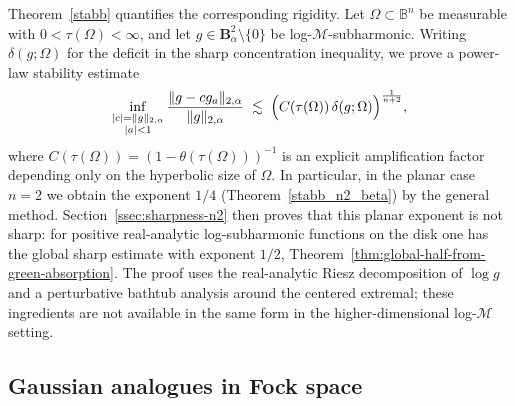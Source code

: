 \documentclass[a4paper,10pt]{amsart}
\begin{document}
Theorem~\ref{stabb} quantifies the corresponding rigidity.
Let $\Omega\subset\mathbb B^n$ be measurable with $0<\tau(\Omega)<\infty$, and let
$g\in \mathbf B_\alpha^2\setminus\{0\}$ be log-$\mathcal M$-subharmonic.
Writing $\delta(g;\Omega)$ for the deficit in the sharp concentration inequality, we prove a
power-law stability estimate
\[
\inf_{\substack{|c|=\|g\|_{2,\alpha}\\ |a|<1}}
\frac{\|g-cg_a\|_{2,\alpha}}{\|g\|_{2,\alpha}}
\;\lesssim\;
\Bigl(C(\tau(\Omega))\,\delta(g;\Omega)\Bigr)^{\frac{1}{n+2}},
\]
where $C(\tau(\Omega))=(1-\theta(\tau(\Omega)))^{-1}$ is an explicit amplification factor depending
only on the hyperbolic size of $\Omega$. In particular, in the planar case $n=2$ we obtain the
exponent $1/4$ (Theorem~\ref{stabb_n2_beta}) by the general method.
Section~\ref{ssec:sharpness-n2} then proves that this planar exponent is not
sharp: for positive real-analytic log-subharmonic functions on the disk one has
the global sharp estimate with exponent $1/2$,
Theorem~\ref{thm:global-half-from-green-absorption}. The proof uses the
real-analytic Riesz decomposition of $\log g$ and a perturbative bathtub
analysis around the centered extremal; these ingredients are not available in
the same form in the higher-dimensional log-$\mathcal M$ setting.

\subsection{Gaussian analogues in Fock space}
\end{document}

